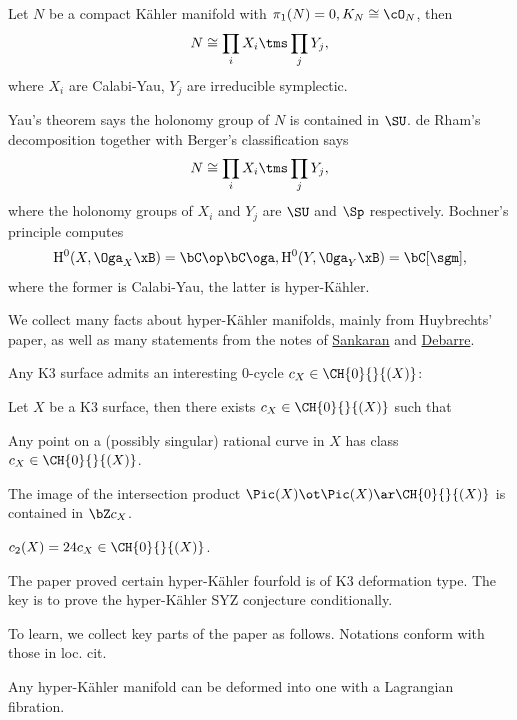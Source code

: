 \documentclass[a4paper, twoside]{article}
\begin{document}
\begin{lem}
	Let $N$ be a compact K{\"a}hler manifold with $\pi_{1}(N)=0, K_{N}\cong\cO_{N}$, then
	\[
		N\cong\prod_{i}X_{i}\tms\prod_{j}Y_{j},
	\]
	where $X_{i}$ are Calabi-Yau, $Y_{j}$ are irreducible symplectic.
\end{lem}

\begin{prf}
	Yau's theorem says the holonomy group of $N$ is contained in $\SU$. de Rham's decomposition together with Berger's classification says
	\[
		N\cong\prod_{i}X_{i}\tms\prod_{j}Y_{j},
	\]
	where the holonomy groups of $X_{i}$ and $Y_{j}$ are $\SU$ and $\Sp$ respectively. Bochner's principle computes
	\[
		\mathrm{H}_{}^{0}(X,\Oga_{X}\xB)=\bC\op\bC\oga, \mathrm{H}_{}^{0}(Y,\Oga_{Y}\xB)=\bC[\sgm],
	\]
	where the former is Calabi-Yau, the latter is hyper-K{\"a}hler.
\end{prf}



We collect many facts about hyper-K{\"a}hler manifolds, mainly from Huybrechts' paper\cite{Huybrechts1999}, as well as many statements from the notes of \href{https://people.bath.ac.uk/masgks/Papers/kinosaki19.pdf}{Sankaran} and \href{https://www.math.ens.psl.eu/~debarre/HKmanifolds.pdf}{Debarre}.


Any K3 surface admits an interesting $0$-cycle $c_{X}\in\CH{0}{}{(X)}$:
\begin{thm}[{\cite[Theorem~1]{BV2004}}]
	Let $X$ be a K3 surface, then there exists $c_{X}\in\CH{0}{}{(X)}$ such that
	\begin{enr}
		\item Any point on a (possibly singular) rational curve in $X$ has class $c_{X}\in\CH{0}{}{(X)}$.
		\item The image of the intersection product $\Pic(X)\ot\Pic(X)\ar\CH{0}{}{(X)}$ is contained in $\bZ c_{X}$.
		\item $c_{2}(X)=24c_{X}\in\CH{0}{}{(X)}$.
	\end{enr}
\end{thm}




The paper proved certain hyper-K{\"a}hler fourfold is of K3\ts{[2]}  deformation type. The key is to prove the hyper-K{\"a}hler SYZ conjecture conditionally.

To learn, we collect key parts of the paper as follows. Notations conform with those in loc. cit.


\begin{cnj}
	Any hyper-K{\"a}hler manifold can be deformed into one with a Lagrangian fibration.
\end{cnj}
\end{document}
